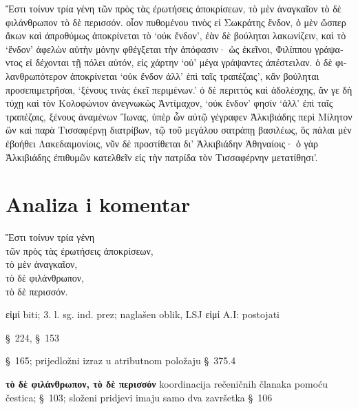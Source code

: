 {\large
\begin{greek}
\noindent  Ἔστι τοίνυν τρία γένη τῶν πρὸς τὰς ἐρωτήσεις ἀποκρίσεων, τὸ μὲν ἀναγκαῖον τὸ δὲ φιλάνθρωπον τὸ δὲ περισσόν. οἷον πυθομένου τινὸς εἰ Σωκράτης ἔνδον, ὁ μὲν ὥσπερ ἄκων καὶ ἀπροθύμως ἀποκρίνεται τὸ ‘οὐκ ἔνδον’, ἐὰν δὲ βούληται λακωνίζειν, καὶ τὸ ‘ἔνδον’ ἀφελὼν αὐτὴν μόνην φθέγξεται τὴν ἀπόφασιν· ὡς ἐκεῖνοι, Φιλίππου γράψαντος εἰ δέχονται τῇ πόλει αὐτόν, εἰς χάρτην ‘οὐ’ μέγα γράψαντες ἀπέστειλαν. ὁ δὲ φιλανθρωπότερον ἀποκρίνεται ‘οὐκ ἔνδον ἀλλ' ἐπὶ ταῖς τραπέζαις’, κἂν βούληται προσεπιμετρῆσαι, ‘ξένους τινὰς ἐκεῖ περιμένων.’ ὁ δὲ περιττὸς καὶ ἀδολέσχης, ἄν γε δὴ τύχῃ καὶ τὸν Κολοφώνιον ἀνεγνωκὼς Ἀντίμαχον, ‘οὐκ ἔνδον’ φησίν ‘ἀλλ' ἐπὶ ταῖς τραπέζαις, ξένους ἀναμένων  Ἴωνας, ὑπὲρ ὧν αὐτῷ γέγραφεν Ἀλκιβιάδης περὶ Μίλητον ὢν καὶ παρὰ Τισσαφέρνῃ διατρίβων, τῷ τοῦ μεγάλου σατράπῃ βασιλέως, ὃς πάλαι μὲν ἐβοήθει Λακεδαιμονίοις, νῦν δὲ προστίθεται δι' Ἀλκιβιάδην Ἀθηναίοις· ὁ γὰρ Ἀλκιβιάδης ἐπιθυμῶν κατελθεῖν εἰς τὴν πατρίδα τὸν Τισσαφέρνην μετατίθησι’.

\end{greek}
}


\section*{Analiza i komentar}



{\large
\begin{greek}
\noindent  Ἔστι τοίνυν τρία γένη \\
\tabto{2em} τῶν πρὸς τὰς ἐρωτήσεις ἀποκρίσεων, \\
τὸ μὲν ἀναγκαῖον, \\
τὸ δὲ φιλάνθρωπον, \\
τὸ δὲ περισσόν.\\

\end{greek}
}

\begin{description}[noitemsep] 
\item[ Ἔστι] εἰμί biti; 3. l. sg. ind. prez; naglašen oblik, LSJ εἰμί A.I: postojati
\item[τρία γένη] §~224, §~153
\item[τῶν πρὸς τὰς ἐρωτήσεις ἀποκρίσεων] §~165; prijedložni izraz u atributnom položaju §~375.4
\item[τὸ μὲν ἀναγκαῖον,] \textbf{τὸ δὲ φιλάνθρωπον, τὸ δὲ περισσόν} koordinacija rečeničnih članaka pomoću čestica; §~103; složeni pridjevi imaju samo dva završetka §~106

\end{description}


